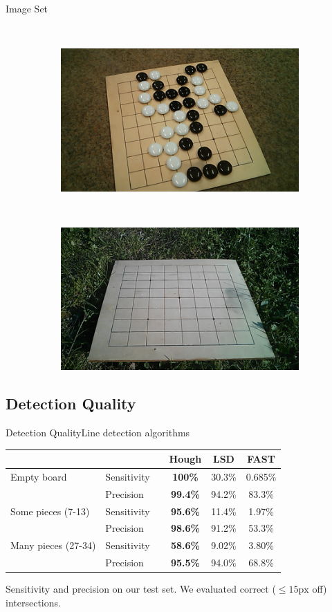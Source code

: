 \documentclass[table]{beamer}
\begin{document}
\begin{frame}{Image Set}
\begin{figure}
\begin{subfigure}{}
		\end{subfigure}
		~
		\begin{subfigure}{}
				\includegraphics[width=0.3\columnwidth]{images/neonFloor_many_centerLow_rotated.png}
		\end{subfigure}
		~
		\begin{subfigure}{}
			\includegraphics[width=0.3\columnwidth]{images/sunnyGrass_empty_centerLow.png}
		\end{subfigure}
	\end{figure}

\end{frame}

\subsection{Detection Quality}
\begin{frame}{Detection Quality}{Line detection algorithms}
	\begin{table}
		\centering
		\begin{tabular}{llc>{\bfseries}ccc}
		    \multicolumn{2}{c}{}									&\hphantom{A} & Hough 	& LSD 		& FAST     \\

			\toprule
			Empty board 			   		& Sensitivity 			&& 100\%	& 30.3\%  	& 0.685\%  \\
											& Precision			 	&& 99.4\% 	& 94.2\%  	& 83.3\%  \\
			\midrule
			Some pieces (7-13)				& Sensitivity	 		&& 95.6\% 	& 11.4\% 	& 1.97\%   \\
											& Precision 			&& 98.6\% 	& 91.2\%  	& 53.3\%  \\
			\midrule
			Many pieces (27-34) 			& Sensitivity		 	&& 58.6\% 	& 9.02\% 	& 3.80\%   \\
											& Precision			 	&& 95.5\% 	& 94.0\%  	& 68.8\%  \\
			\bottomrule
		\end{tabular}
	\end{table}
	Sensitivity and precision on our test set. We evaluated correct ($\leq 15\text{px}$ off) intersections.
\end{frame}
\end{document}
